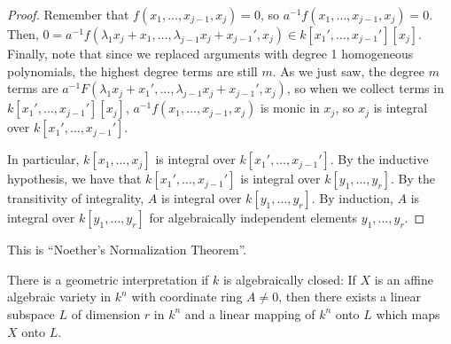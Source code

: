 \begin{proof}
Remember that $f(x_1,\ldots,x_{j-1},x_j) = 0$, so $a^{-1}f(x_1,\ldots,x_{j-1},x_j) = 0$. Then, 
$0 = a^{-1}f(\lambda_1 x_j + x_1, \ldots, \lambda_{j-1}x_j + x_{j-1}', x_j) \in k[x_1',\ldots,x_{j-1}'][x_j]$. Finally, note that since we replaced
arguments with degree 1 homogeneous polynomials, the highest degree terms are still $m$. As we just saw, the degree $m$ terms are 
$a^{-1}F(\lambda_1 x_j + x_1',\ldots, \lambda_{j-1} x_j + x_{j-1}', x_j)$, so when we collect terms in $k[x_1',\ldots,x_{j-1}'][x_j]$,
$a^{-1}f(x_1,\ldots,x_{j-1},x_j)$ is monic in $x_j$, so $x_j$ is integral over $k[x_1',\ldots,x_{j-1}']$. 

In particular, $k[x_1,\ldots,x_j]$ is integral over $k[x_1',\ldots,x_{j-1}']$. By the inductive hypothesis, we have that 
$k[x_1',\ldots,x_{j-1}']$ is integral over $k[y_1,\ldots,y_r]$. By the transitivity of integrality, $A$ is integral over $k[y_1,\ldots,y_r]$. 
By induction, $A$ is integral over $k[y_1,\ldots,y_r]$ for algebraically independent elements $y_1,\ldots,y_r$.
\end{proof}

\begin{remark}
This is ``Noether's Normalization Theorem''.
\end{remark}

There is a geometric interpretation if $k$ is algebraically closed: If $X$ is an affine algebraic variety in $k^n$ with coordinate ring
$A \neq 0$, then there exists a linear subspace $L$ of dimension $r$ in $k^n$ and a linear mapping of $k^n$ onto $L$ which maps $X$ onto $L$.

